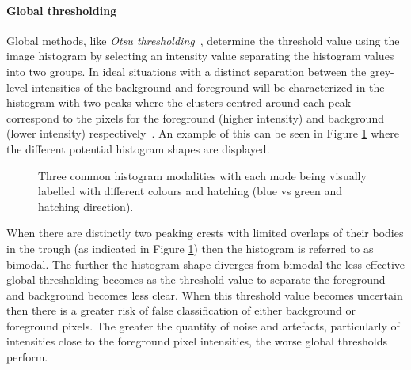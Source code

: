 \paragraph{Global thresholding}
Global methods, like \textit{Otsu thresholding}~\cite{Otsu1979ATS}, determine the threshold value using the image histogram by selecting an intensity value separating the histogram values into two groups. In ideal situations with a distinct separation between the grey-level intensities of the background and foreground will be characterized in the histogram with two peaks where the clusters centred around each peak correspond to the pixels for the foreground (higher intensity) and background (lower intensity) respectively~\cite[p.163]{segmentation_book}. An example of this can be seen in Figure \ref{fig:histogram_appearances} where the different potential histogram shapes are displayed.
\begin{figure}
    \centering
    \caption[Three common histogram modalities]{Three common histogram modalities with each mode being visually labelled with different colours and hatching (blue vs green and hatching direction).}
    \label{fig:histogram_appearances}
\end{figure}
When there are distinctly two peaking crests with limited overlaps of their bodies in the trough (as indicated in Figure \ref{fig:histogram_appearances}) then the histogram is referred to as bimodal. The further the histogram shape diverges from bimodal the less effective global thresholding becomes as the threshold value to separate the foreground and background becomes less clear. When this threshold value becomes uncertain then there is a greater risk of false classification of either background or foreground pixels. The greater the quantity of noise and artefacts, particularly of intensities close to the foreground pixel intensities, the worse global thresholds perform.
